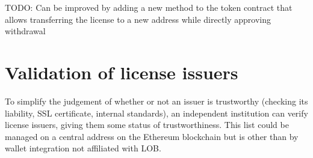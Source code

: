 \documentclass[a4paper]{article}
\newcommand{\todo}[1]{\textsf{TODO: #1}}
\begin{document}
\todo{Can be improved by adding a new method to the token contract that allows transferring the license to a new address while directly approving withdrawal}

%
%
%
%

\section{Validation of license issuers}
\label{ch:licenseIssuerValidation}

To simplify the judgement of whether or not an issuer is trustworthy (checking its liability, SSL certificate, internal standards), an independent institution can verify license issuers, giving them some status of trustworthiness. This list could be managed on a central address on the Ethereum blockchain but is other than by wallet integration not affiliated with LOB.


\end{document}
